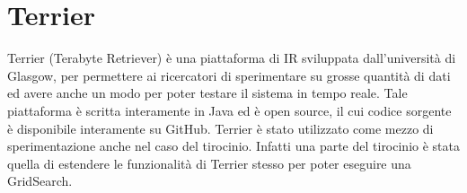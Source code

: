 \chapter{Terrier}
Terrier (Terabyte Retriever) è una piattaforma di IR sviluppata dall'università di Glasgow, per permettere ai ricercatori di sperimentare su
grosse quantità di dati ed avere anche un modo per poter testare il sistema in tempo reale.
Tale piattaforma è scritta interamente in Java ed è open source, il cui codice sorgente è disponibile
interamente su GitHub.
Terrier è stato utilizzato come mezzo di sperimentazione anche nel caso del tirocinio. Infatti
una parte del tirocinio è stata quella di estendere le funzionalità di Terrier stesso per poter eseguire
una GridSearch.